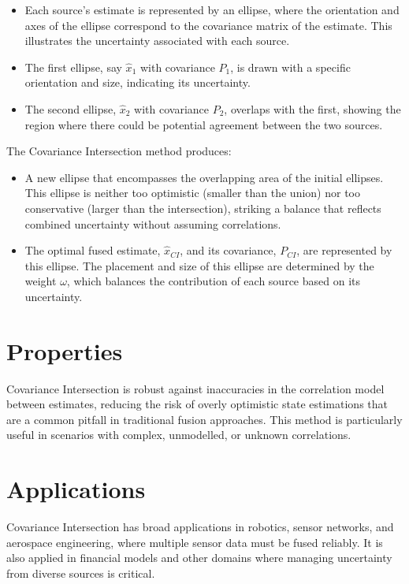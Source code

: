 \documentclass[12pt,a4paper,oneside,onecolumn]{book}
\begin{document}
\begin{itemize}
    \item Each source's estimate is represented by an ellipse, where the orientation and axes of the ellipse correspond to the covariance matrix of the estimate. This illustrates the uncertainty associated with each source.
    \item The first ellipse, say \(\hat{x}_1\) with covariance \(P_1\), is drawn with a specific orientation and size, indicating its uncertainty.
    \item The second ellipse, \(\hat{x}_2\) with covariance \(P_2\), overlaps with the first, showing the region where there could be potential agreement between the two sources.
\end{itemize}


The Covariance Intersection method produces:
\begin{itemize}
    \item A new ellipse that encompasses the overlapping area of the initial ellipses. This ellipse is neither too optimistic (smaller than the union) nor too conservative (larger than the intersection), striking a balance that reflects combined uncertainty without assuming correlations.
    \item The optimal fused estimate, \(\hat{x}_{CI}\), and its covariance, \(P_{CI}\), are represented by this ellipse. The placement and size of this ellipse are determined by the weight \(\omega\), which balances the contribution of each source based on its uncertainty.
\end{itemize}


\section{Properties}

Covariance Intersection is robust against inaccuracies in the correlation model between estimates, reducing the risk of overly optimistic state estimations that are a common pitfall in traditional fusion approaches. This method is particularly useful in scenarios with complex, unmodelled, or unknown correlations.

\section{Applications}

Covariance Intersection has broad applications in robotics, sensor networks, and aerospace engineering, where multiple sensor data must be fused reliably. It is also applied in financial models and other domains where managing uncertainty from diverse sources is critical.
\end{document}

